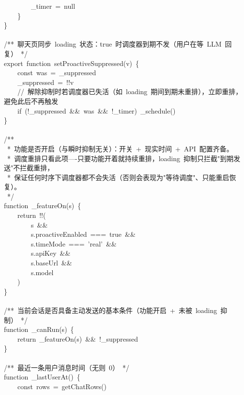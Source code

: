 \documentclass[a4paper,10pt]{article}
\begin{document}
{\ttfamily\footnotesize\raggedright
~~~~~~~~\_timer~=~null\\
~~~~\}\\
\}\\
\mbox{}\\
/**~聊天页同步~loading~状态：true~时调度器到期不发（用户在等~LLM~回复）~*/\\
export~function~setProactiveSuppressed(v)~\{\\
~~~~const~was~=~\_suppressed\\
~~~~\_suppressed~=~!!v\\
~~~~//~解除抑制时若调度器已失活（如~loading~期间到期未重排），立即重排，避免此后不再触发\\
~~~~if~(!\_suppressed~\&\&~was~\&\&~!\_timer)~\_schedule()\\
\}\\
\mbox{}\\
/**\\
~*~功能是否开启（与瞬时抑制无关）：开关~+~现实时间~+~API~配置齐备。\\
~*~调度重排只看此项----只要功能开着就持续重排，loading~抑制只拦截"到期发送"不拦截重排，\\
~*~保证任何时序下调度器都不会失活（否则会表现为"等待调度"、只能重启恢复）。\\
~*/\\
function~\_featureOn(s)~\{\\
~~~~return~!!(\\
~~~~~~~~s~\&\&\\
~~~~~~~~s.proactiveEnabled~===~true~\&\&\\
~~~~~~~~s.timeMode~===~'real'~\&\&\\
~~~~~~~~s.apiKey~\&\&\\
~~~~~~~~s.baseUrl~\&\&\\
~~~~~~~~s.model\\
~~~~)\\
\}\\
\mbox{}\\
/**~当前会话是否具备主动发送的基本条件（功能开启~+~未被~loading~抑制）~*/\\
function~\_canRun(s)~\{\\
~~~~return~\_featureOn(s)~\&\&~!\_suppressed\\
\}\\
\mbox{}\\
/**~最近一条用户消息时间（无则~0）~*/\\
function~\_lastUserAt()~\{\\
~~~~const~rows~=~getChatRows()\\
}
\end{document}
